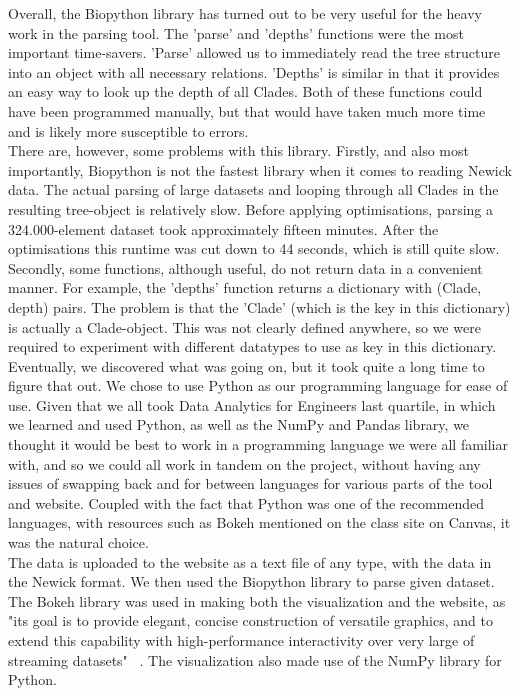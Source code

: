 \documentclass[journal, 9pt]{vgtc}                %
\begin{document}
	
	Overall, the Biopython library has turned out to be very useful for the heavy work in the parsing tool. The 'parse' and 'depths' functions were the most important time-savers. 'Parse' allowed us to immediately read the tree structure into an object with all necessary relations. 'Depths' is similar in that it provides an easy way to look up the depth of all Clades. Both of these functions could have been programmed manually, but that would have taken much more time and is likely more susceptible to errors.\\
	There are, however, some problems with this library. Firstly, and also most importantly, Biopython is not the fastest library when it comes to reading Newick data. The actual parsing of large datasets and looping through all Clades in the resulting tree-object is relatively slow. Before applying optimisations, parsing a 324.000-element dataset took approximately fifteen minutes. After the optimisations this runtime was cut down to 44 seconds, which is still quite slow. Secondly, some functions, although useful, do not return data in a convenient manner. For example, the 'depths' function returns a dictionary with (Clade, depth) pairs. The problem is that the 'Clade' (which is the key in this dictionary) is actually a Clade-object. This was not clearly defined anywhere, so we were required to experiment with different datatypes to use as key in this dictionary. Eventually, we discovered what was going on, but it took quite a long time to figure that out.
We chose to use Python as our programming language for ease of use. Given that we all took Data Analytics for Engineers last quartile, in which
we learned and used Python, as well as the NumPy and Pandas library, we thought it would be best to work in a programming language we were
all familiar with, and so we could all work in tandem on the project, without having any issues of swapping back and for between languages for 
various parts of the tool and website. Coupled with the fact that Python was one of the recommended languages, with resources such as Bokeh 
mentioned on the class site on Canvas, it was the natural choice.\\
The data is uploaded to the website as a text file of any type, with the data in the Newick format. We then used the Biopython library to parse
given dataset. The Bokeh  library was used in making both the visualization and the website, as "its goal is to provide elegant, concise construction of versatile graphics,
and to extend this capability with high-performance interactivity over very large of streaming datasets" ~\cite{bokeh}. The visualization also made use 
of the NumPy library for Python.\\
\end{document}
